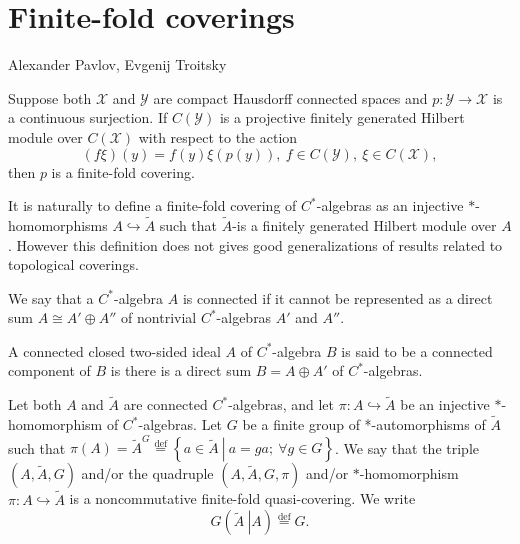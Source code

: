 \documentclass{beamer}
\theoremstyle{plain}
\newcommand{\be}{\begin{equation}}
\newcommand{\ee}{\end{equation}}
\newcommand{\hookto}{\hookrightarrow}        %
\begin{document}
\section{Finite-fold coverings}
\begin{frame}
	
	\alert{Alexander Pavlov, Evgenij Troitsky}
	\begin{theorem}
		Suppose both $\mathcal X$ and $\mathcal Y$ are compact Hausdorff connected spaces and $p :\mathcal  Y \to \mathcal X$
		is a continuous surjection. If $C(\mathcal Y )$ is a projective finitely generated Hilbert module over
		$C(\mathcal X)$ with respect to the action
		\begin{equation*}
			(f\xi)(y) = f(y)\xi(p(y)), ~ f \in  C(\mathcal Y ), ~ \xi \in  C(\mathcal X),
		\end{equation*}
		then $p$ is a finite-fold  covering.
	\end{theorem}
	It is naturally to define a finite-fold covering of $C^*$-algebras as an injective $*$-homomorphisms $A\hookto \widetilde A$ such that $ \widetilde A$-is a finitely generated Hilbert module over
	$A$. However this definition does not gives good generalizations of results  related to topological coverings.
	
\end{frame}
\begin{frame}
  \begin{definition}\label{connected_c_a_defn}
	We say that a $C^*$-algebra $A$ is \alert{connected} if it cannot be represented as a direct sum  $A \cong A' \oplus A''$ of nontrivial $C^*$-algebras $A'$ and $A''$.
	
\end{definition}
\begin{definition}\label{connected_comp_defn}
	A connected closed two-sided ideal $A$ of  $C^*$-algebra $B$ is said to be a \alert{connected component of}  $B$ is there is a direct sum $B = A \oplus A'$ of $C^*$-algebras.
	\end{definition}
\end{frame}
\begin{frame}
   \begin{definition}\label{fin_quasi_defn}
	Let both  $A$ and  $\widetilde{A}$ are connected $C^*$-algebras, and let $\pi: A \hookto \widetilde{A}$ be an injective $*$-homomorphism of %
	$C^*$-algebras. Let $G$ be a finite  group of *-automorphisms of $\widetilde{A}$ such that 	$\pi\left(A\right) = \widetilde{A}^G\stackrel{\text{def}}{=}\left\{
	\left.a\in \widetilde{A}~\right|~ a = g a;~ \forall g \in G\right\}$.	We say that the triple $\left(A, \widetilde{A}, G \right)$ and/or the quadruple $\left(A, \widetilde{A}, G, \pi \right)$ and/or $*$-homomorphism $\pi: A \hookto \widetilde{A}$   is a \alert{noncommutative finite-fold  quasi-covering}. We write
	\be\label{fin_cov_gr_eqn}
	G\left(\left.\widetilde{A}~\right| {A} \right) \stackrel{\text{def}}{=}  	G.
	\ee
\end{definition}
\end{frame}
\end{document}
